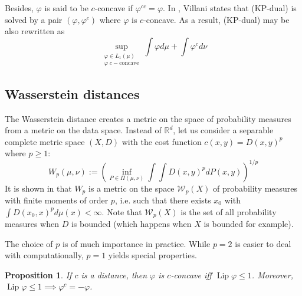 \documentclass{article}
\newtheorem{prop}{Proposition}[section]
\theoremstyle{definition}
\theoremstyle{remark}
\DeclareMathOperator{\lip}{Lip}
\begin{document}
Besides, $\varphi$ is said to be $c$-concave if $\varphi^{cc}=\varphi$. In \cite{villani2003topics}, Villani states that (KP-dual) is solved by a pair $(\varphi, \varphi^c)$ where $\varphi$ is $c$-concave. As a result, (KP-dual) may be also rewritten as 
\begin{equation}\tag{KP-dual 4}
\sup_{\substack{\varphi \in L_1(\mu)\\ \varphi\; c-\text{concave}}} \int \varphi d\mu + \int \varphi^c d\nu
\end{equation}

\subsection{Wasserstein distances}

The Wasserstein distance creates a metric on the space of probability measures from a metric on the data space. Instead of $\mathbb R^d$, let us consider a separable complete metric space $(X,D)$ with the cost function $c(x,y) = D(x,y)^p$ where $p\geq 1$:
$$W_p(\mu, \nu) := \left(\inf_{P\in \Pi(\mu, \nu)} \int\int D(x,y)^p dP(x,y) \right)^{1/p}$$
It is shown in \cite{villani2003topics} that $W_p$ is a metric on the space $\mathcal W_p(X)$ of probability measures with finite moments of order $p$, i.e. such that there exists $x_0$ with $\int D(x_0,x)^p d\mu(x) <\infty$. Note that $\mathcal W_p(X)$ is the set of all probability measures when $D$ is bounded (which happens when $X$ is bounded for example).

The choice of $p$ is of much importance in practice. While $p=2$ is easier to deal with computationally, $p=1$ yields special properties.
\begin{prop}
If $c$ is a distance, then $\varphi$ is $c$-concave iff $\lip \varphi \leq 1$. Moreover, $\lip \varphi \leq 1 \implies \varphi^c = -\varphi$.
\end{prop}
\end{document}
